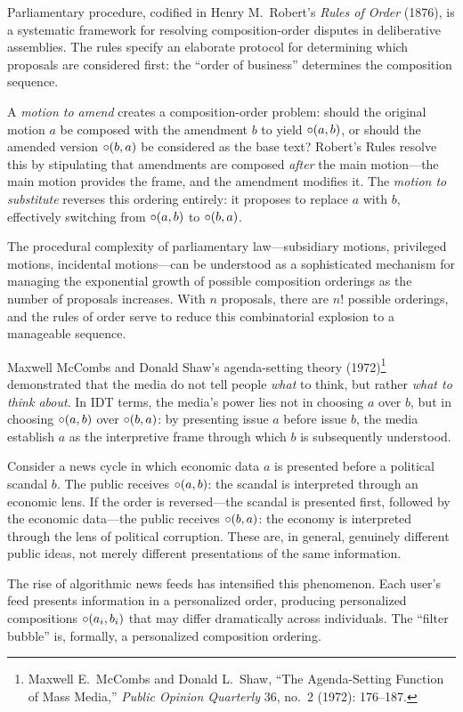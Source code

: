 \begin{example}
\label{ex:roberts_rules}
Parliamentary procedure, codified in Henry M.\ Robert's
\textit{Rules of Order} (1876), is a systematic framework for resolving
composition-order disputes in deliberative assemblies.  The rules specify
an elaborate protocol for determining which proposals are considered first:
the ``order of business'' determines the composition sequence.

A \emph{motion to amend} creates a composition-order problem: should the
original motion $a$ be composed with the amendment $b$ to yield
$\circ(a, b)$, or should the amended version $\circ(b, a)$ be
considered as the base text?  Robert's Rules resolve this by stipulating
that amendments are composed \emph{after} the main motion---the main
motion provides the frame, and the amendment modifies it.  The
\emph{motion to substitute} reverses this ordering entirely: it proposes
to replace $a$ with $b$, effectively switching from $\circ(a, b)$ to
$\circ(b, a)$.

The procedural complexity of parliamentary law---subsidiary motions,
privileged motions, incidental motions---can be understood as a
sophisticated mechanism for managing the exponential growth of possible
composition orderings as the number of proposals increases.  With $n$
proposals, there are $n!$ possible orderings, and the rules of order
serve to reduce this combinatorial explosion to a manageable sequence.
\end{example}

\begin{example}
\label{ex:media_agenda}
Maxwell McCombs and Donald Shaw's agenda-setting theory (1972)\footnote{Maxwell
E.\ McCombs and Donald L.\ Shaw, ``The Agenda-Setting Function of Mass
Media,'' \textit{Public Opinion Quarterly} 36, no.\ 2 (1972): 176--187.}
demonstrated that the media do not tell people \emph{what} to think, but
rather \emph{what to think about}.  In IDT terms, the media's power lies
not in choosing $a$ over $b$, but in choosing $\circ(a, b)$ over
$\circ(b, a)$: by presenting issue $a$ before issue $b$, the media
establish $a$ as the interpretive frame through which $b$ is subsequently
understood.

Consider a news cycle in which economic data $a$ is presented before a
political scandal $b$.  The public receives $\circ(a, b)$: the scandal
is interpreted through an economic lens.  If the order is reversed---the
scandal is presented first, followed by the economic data---the public
receives $\circ(b, a)$: the economy is interpreted through the lens of
political corruption.  These are, in general, genuinely different public
ideas, not merely different presentations of the same information.

The rise of algorithmic news feeds has intensified this phenomenon.  Each
user's feed presents information in a personalized order, producing
personalized compositions $\circ(a_i, b_i)$ that may differ
dramatically across individuals.  The ``filter bubble'' is, formally, a
personalized composition ordering.
\end{example}

